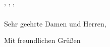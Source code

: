 \documentclass[USenglish,ngerman]{article} %
\title{}
\author{\sendname{} \sendsurname{}}
\date{\today}
\newcommand{\sendsurname}{}
\newcommand{\sendname}{}
\newcommand{\sendstreet}{}
\newcommand{\sendzip}{}
\newcommand{\sendcity}{}
\newcommand{\sendcountry}{}
\newcommand{\sendemail}{}
\newcommand{\sendphone}{}
\newcommand{\recsurname}{}
\newcommand{\recname}{}
\newcommand{\recspecial}{}
\newcommand{\recstreet}{}
\newcommand{\reczip}{}
\newcommand{\reccity}{}
\newcommand{\reccountry}{}
\begin{document}
\begin{flushright}
  \textbf{\sendname{} \sendsurname{}}\break{}
  \sendstreet{}\break{}
  \sendzip{} \sendcity{}\break{}
  \sendcountry{}\break{}
  \sendemail{}\break{}
  \sendphone{}%
\end{flushright}

\bigskip

{\scriptsize \sendname{} \sendsurname{}, \sendstreet{}, \sendzip{} \sendcity{}, \sendcountry{}}
\bigskip\newline{}
\textbf{\recname{} \recsurname{}}\newline{}
\recspecial{}\newline{}
\recstreet{}\newline{}
\reczip{} \reccity{}\newline{}
\reccountry{}

\bigskip

\begin{flushright}
  \thedate{}
\end{flushright}

\subsubsection*{\thetitle}


\bigskip
Sehr geehrte Damen und Herren,
\bigskip


\bigskip
Mit freundlichen Grüßen
\bigskip


\bigskip
\makebox[2.5in]{\hrulefill}\newline{}
\end{document}
